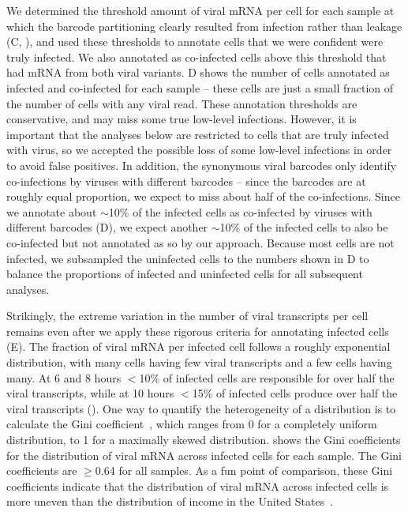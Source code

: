 \documentclass[9pt,lineno]{elife}
\begin{document}
We determined the threshold amount of viral mRNA per cell for each sample at which the barcode partitioning clearly resulted from infection rather than leakage (C, ), and used these thresholds to annotate cells that we were confident were truly infected.
We also annotated as co-infected cells above this threshold that had mRNA from both viral variants.
D shows the number of cells annotated as infected and co-infected for each sample -- these cells are just a small fraction of the number of cells with any viral read.
These annotation thresholds are conservative, and may miss some true low-level infections.
However, it is important that the analyses below are restricted to cells that are truly infected with virus, so we accepted the possible loss of some low-level infections in order to avoid false positives.
In addition, the synonymous viral barcodes only identify co-infections by viruses with different barcodes -- since the barcodes are at roughly equal proportion, we expect to miss about half of the co-infections.
Since we annotate about $\sim$10\% of the infected cells as co-infected by viruses with different barcodes (D), we expect another $\sim$10\% of the infected cells to also be co-infected but not annotated as so by our approach.
Because most cells are not infected, we subsampled the uninfected cells to the numbers shown in D to balance the proportions of infected and uninfected cells for all subsequent analyses.

Strikingly, the extreme variation in the number of viral transcripts per cell remains even after we apply these rigorous criteria for annotating infected cells (E). 
The fraction of viral mRNA per infected cell follows a roughly exponential distribution, with many cells having few viral transcripts and a few cells having many.
At 6 and 8 hours $<$10\% of infected cells are responsible for over half the viral transcripts, while at 10 hours $<$15\% of infected cells produce over half the viral transcripts ().
One way to quantify the heterogeneity of a distribution is to calculate the Gini coefficient~\citep{gini1921measurement}, which ranges from 0 for a completely uniform distribution, to 1 for a maximally skewed distribution.
 shows the Gini coefficients for the distribution of viral mRNA across infected cells for each sample.
The Gini coefficients are $\ge$0.64 for all samples.
As a fun point of comparison, these Gini coefficients indicate that the distribution of viral mRNA across infected cells is more uneven than the distribution of income in the United States~\citep{alvaredo2011note}. 
\end{document}
